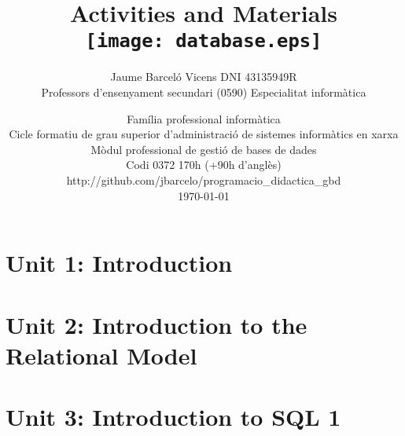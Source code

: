 \documentclass[catalan, a4paper, 12pt, titlepage]{article}
\title{Activities and Materials\\ 
	\vspace{1cm}
	\texttt{[image: database.eps]}
	}
\author{
	Jaume Barceló Vicens
	DNI 43135949R\\
	Professors d'ensenyament secundari (0590)
	Especialitat informàtica}
\date{
	Família professional informàtica \\
	Cicle formatiu de grau superior d’administració de sistemes informàtics en xarxa\\
	Mòdul professional de gestió de bases de dades\\
	Codi 0372 170h (+90h d'anglès)\\
	http://github.com/jbarcelo/programacio\_didactica\_gbd \\
	\faCalendar*[regular] \today %
	}
\begin{document}
\pagestyle{empty}

\maketitle

\tableofcontents

\newpage

\pagestyle{fancy}

\section{Unit 1: Introduction}

%




\section{Unit 2: Introduction to the Relational Model}

%






\section{Unit 3: Introduction to SQL 1}

%






\end{document}
